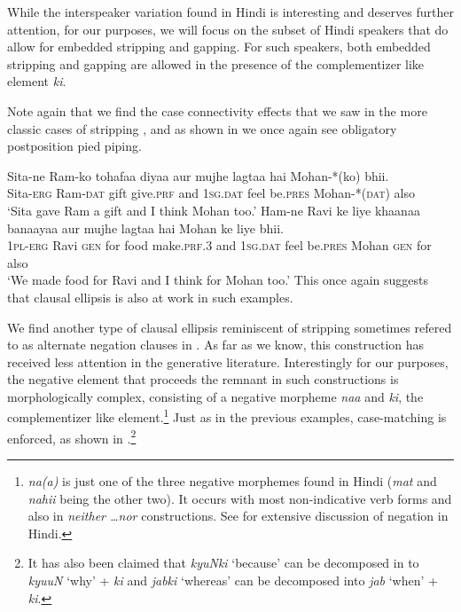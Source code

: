 \documentclass[output=paper]{langscibook}
\begin{document}
While the interspeaker variation found in Hindi is interesting and deserves further attention, for our purposes, we will focus on the subset of Hindi speakers that do allow for embedded stripping and gapping. For such speakers, both embedded stripping and gapping are allowed in the presence of the complementizer like element \emph{ki}.

Note again that we find the case connectivity effects that we saw in the more classic cases of stripping , and as shown in  we once again see obligatory postposition pied piping.

\ea 
    \ea \label{maex15:a}
        \gll Sita-ne Ram-ko tohafaa diyaa aur mujhe lagtaa hai Mohan-*(ko) bhii.\\
        Sita-\textsc{erg} Ram-\textsc{dat} gift give.\textsc{prf} and \textsc{1sg.dat} feel be.\textsc{pres} Mohan-*(\textsc{dat}) also\\
        \glt `Sita gave Ram a gift and I think Mohan too.'
    \ex \label{maex15:b}
        \gll Ham-ne Ravi ke liye khaanaa banaayaa aur mujhe lagtaa hai Mohan ke liye bhii.\\
        \textsc{1pl-erg} Ravi \textsc{gen} for food make.\textsc{prf.3} and \textsc{1sg.dat} feel be.\textsc{pres} Mohan \textsc{gen} for also\\
        \glt `We made food for Ravi and I think for Mohan too.'
    \z 
\z 
This once again suggests that clausal ellipsis is also at work in such examples.

We find another type of clausal ellipsis reminiscent of stripping sometimes refered to as  alternate negation clauses in \cite{Sinha05}. As far as we know, this construction has received less attention in the generative literature.  Interestingly for our purposes, the negative element that proceeds the remnant in such constructions is morphologically complex, consisting of a negative morpheme \emph{naa} and \emph{ki}, the complementizer like element.\footnote{\emph{na(a)} is just one of the three negative morphemes found in Hindi (\emph{mat} and \emph{nahii} being the other two). It occurs with most non-indicative verb forms and also in \emph{neither \dots nor} constructions. See \citealt{bhatia95} for extensive discussion of negation in Hindi.} Just as in the previous examples, case-matching is enforced, as shown in .\footnote{It has also been claimed that \emph{kyuNki} `because' can be decomposed in to \emph{kyuuN} `why' + \emph{ki} and \emph{jabki} `whereas' can be decomposed into \emph{jab} `when' + \emph{ki}.}
\end{document}
